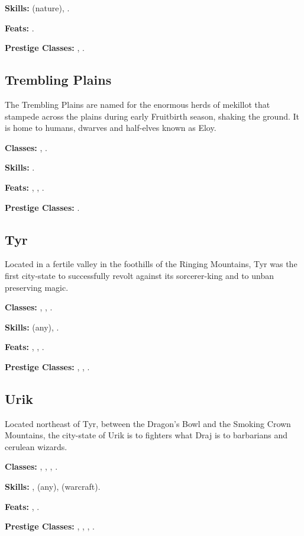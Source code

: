\textbf{Skills:}  (nature), .

\textbf{Feats:} .

\textbf{Prestige Classes:} , .


\subsection{Trembling Plains}
The Trembling Plains are named for the enormous herds of mekillot that stampede across the plains during early Fruitbirth season, shaking the ground. It is home to humans, dwarves and half-elves known as Eloy.

\textbf{Classes:} , .

\textbf{Skills:} .

\textbf{Feats:} , , .

\textbf{Prestige Classes:} .


\subsection{Tyr}
Located in a fertile valley in the foothills of the Ringing Mountains, Tyr was the first city-state to successfully revolt against its sorcerer-king and to unban preserving magic.

\textbf{Classes:} , , .

\textbf{Skills:}  (any), .

\textbf{Feats:} , , .

\textbf{Prestige Classes:} , , .

\subsection{Urik}
Located northeast of Tyr, between the Dragon's Bowl and the Smoking Crown Mountains, the city-state of Urik is to fighters what Draj is to barbarians and cerulean wizards.

\textbf{Classes:} , , , .

\textbf{Skills:} ,  (any),  (warcraft).

\textbf{Feats:} , .

\textbf{Prestige Classes:} , , , .
